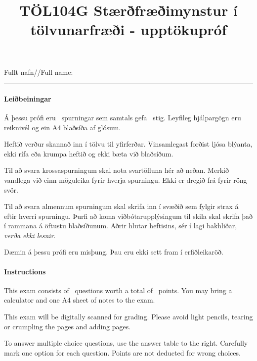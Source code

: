 \documentclass[addpoints]{exam}
\author{}
\date{}
\title{TÖL104G Stærðfræðimynstur í tölvunarfræði - upptökupróf}
\author{}
\date{}
\begin{document}
Fullt nafn//Full name: \vspace*{1mm} \hrule

\begin{center}
    \begin{minipage}{\textwidth}
    
    \vspace{0.7cm}
    \paragraph{Leiðbeiningar} Á þessu prófi eru \numquestions\ spurningar sem samtals gefa \numpoints\ stig. Leyfileg hjálpargögn eru reiknivél og ein A4 blaðsíða af glósum.
    
    Heftið verður skannað inn í tölvu til yfirferðar. Vinsamlegast forðist ljósa blýanta, ekki rífa eða krumpa heftið og ekki bæta við blaðsíðum. 
    
    Til að svara krossaspurningum skal nota svartöfluna hér að neðan. Merkið vandlega við einn möguleika fyrir hverja spurningu. Ekki er dregið frá fyrir röng svör. 
    
    Til að svara almennum spurningum skal skrifa inn í svæðið sem fylgir strax á eftir hverri spurningu. Þurfi að koma viðbótarupplýsingum til skila skal skrifa það í rammana á öftustu blaðsíðunum. Aðrir hlutar heftisins, sér í lagi bakhliðar, \emph{verða ekki lesnir}.
    
    Dæmin á þessu prófi eru misþung. Þau eru ekki sett fram í erfiðleikaröð.
    
    \vspace{0.7cm}
    

    \begin{multicols}{2}

        \paragraph{Instructions} This exam consists of \numquestions\ questions worth a total of \numpoints\ points. You may bring a calculator and one A4 sheet of notes to the exam.
        
        This exam will be digitally scanned for grading. Please avoid light pencils, tearing or crumpling the pages and adding pages. 
        
        To answer multiple choice questions, use the answer table to the right. Carefully mark one option for each question. Points are not deducted for wrong choices. 
        

\end{multicols}
\end{minipage}
\end{center}
\end{document}
